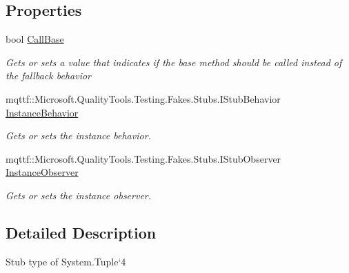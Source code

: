 \subsection*{Properties}
\begin{DoxyCompactItemize}
\item 
bool \hyperlink{class_system_1_1_fakes_1_1_stub_tuple_3_01_t1_00_01_t2_00_01_t3_00_01_t4_01_4_a18756fdfef1b8257059e98204edf227a}{Call\-Base}
\begin{DoxyCompactList}\small\item\em Gets or sets a value that indicates if the base method should be called instead of the fallback behavior\end{DoxyCompactList}\item 
mqttf\-::\-Microsoft.\-Quality\-Tools.\-Testing.\-Fakes.\-Stubs.\-I\-Stub\-Behavior \hyperlink{class_system_1_1_fakes_1_1_stub_tuple_3_01_t1_00_01_t2_00_01_t3_00_01_t4_01_4_aba9bf62051416efe1b2fa2a00cf8a049}{Instance\-Behavior}
\begin{DoxyCompactList}\small\item\em Gets or sets the instance behavior.\end{DoxyCompactList}\item 
mqttf\-::\-Microsoft.\-Quality\-Tools.\-Testing.\-Fakes.\-Stubs.\-I\-Stub\-Observer \hyperlink{class_system_1_1_fakes_1_1_stub_tuple_3_01_t1_00_01_t2_00_01_t3_00_01_t4_01_4_af3403b1d915f4e8e07014c7e2725d5da}{Instance\-Observer}
\begin{DoxyCompactList}\small\item\em Gets or sets the instance observer.\end{DoxyCompactList}\end{DoxyCompactItemize}


\subsection{Detailed Description}
Stub type of System.\-Tuple`4



